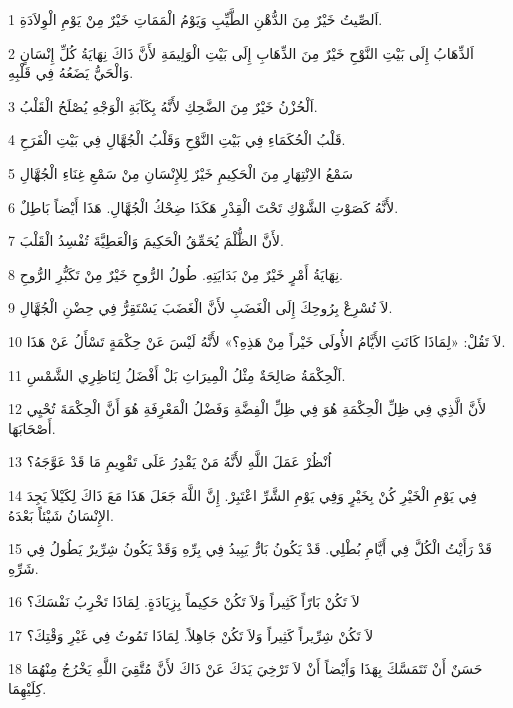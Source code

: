 \par 1 اَلصِّيتُ خَيْرٌ مِنَ الدُّهْنِ الطَّيِّبِ وَيَوْمُ الْمَمَاتِ خَيْرٌ مِنْ يَوْمِ الْوِلاَدَةِ.
\par 2 اَلذِّهَابُ إِلَى بَيْتِ النَّوْحِ خَيْرٌ مِنَ الذِّهَابِ إِلَى بَيْتِ الْوَلِيمَةِ لأَنَّ ذَاكَ نِهَايَةُ كُلِّ إِنْسَانٍ وَالْحَيُّ يَضَعُهُ فِي قَلْبِهِ.
\par 3 اَلْحُزْنُ خَيْرٌ مِنَ الضَّحِكِ لأَنَّهُ بِكَآبَةِ الْوَجْهِ يُصْلَحُ الْقَلْبُ.
\par 4 قَلْبُ الْحُكَمَاءِ فِي بَيْتِ النَّوْحِ وَقَلْبُ الْجُهَّالِ فِي بَيْتِ الْفَرَحِ.
\par 5 سَمْعُ الاِنْتِهَارِ مِنَ الْحَكِيمِ خَيْرٌ لِلإِنْسَانِ مِنْ سَمْعِ غِنَاءِ الْجُهَّالِ
\par 6 لأَنَّهُ كَصَوْتِ الشَّوْكِ تَحْتَ الْقِدْرِ هَكَذَا ضِحْكُ الْجُهَّالِ. هَذَا أَيْضاً بَاطِلٌ.
\par 7 لأَنَّ الظُّلْمَ يُحَمِّقُ الْحَكِيمَ وَالْعَطِيَّةَ تُفْسِدُ الْقَلْبَ.
\par 8 نِهَايَةُ أَمْرٍ خَيْرٌ مِنْ بَدَايَتِهِ. طُولُ الرُّوحِ خَيْرٌ مِنْ تَكَبُّرِ الرُّوحِ.
\par 9 لاَ تُسْرِعْ بِرُوحِكَ إِلَى الْغَضَبِ لأَنَّ الْغَضَبَ يَسْتَقِرُّ فِي حِضْنِ الْجُهَّالِ.
\par 10 لاَ تَقُلْ: «لِمَاذَا كَانَتِ الأَيَّامُ الأُولَى خَيْراً مِنْ هَذِهِ؟» لأَنَّهُ لَيْسَ عَنْ حِكْمَةٍ تَسْأَلُ عَنْ هَذَا.
\par 11 اَلْحِكْمَةُ صَالِحَةٌ مِثْلُ الْمِيرَاثِ بَلْ أَفْضَلُ لِنَاظِرِي الشَّمْسِ.
\par 12 لأَنَّ الَّذِي فِي ظِلِّ الْحِكْمَةِ هُوَ فِي ظِلِّ الْفِضَّةِ وَفَضْلُ الْمَعْرِفَةِ هُوَ أَنَّ الْحِكْمَةَ تُحْيِي أَصْحَابَهَا.
\par 13 اُنْظُرْ عَمَلَ اللَّهِ لأَنَّهُ مَنْ يَقْدِرُ عَلَى تَقْوِيمِ مَا قَدْ عَوَّجَهُ؟
\par 14 فِي يَوْمِ الْخَيْرِ كُنْ بِخَيْرٍ وَفِي يَوْمِ الشَّرِّ اعْتَبِرْ. إِنَّ اللَّهَ جَعَلَ هَذَا مَعَ ذَاكَ لِكَيْلاَ يَجِدَ الإِنْسَانُ شَيْئاً بَعْدَهُ.
\par 15 قَدْ رَأَيْتُ الْكُلَّ فِي أَيَّامِ بُطْلِي. قَدْ يَكُونُ بَارٌّ يَبِيدُ فِي بِرِّهِ وَقَدْ يَكُونُ شِرِّيرٌ يَطُولُ فِي شَرِّهِ.
\par 16 لاَ تَكُنْ بَارّاً كَثِيراً وَلاَ تَكُنْ حَكِيماً بِزِيَادَةٍ. لِمَاذَا تَخْرِبُ نَفْسَكَ؟
\par 17 لاَ تَكُنْ شِرِّيراً كَثِيراً وَلاَ تَكُنْ جَاهِلاً. لِمَاذَا تَمُوتُ فِي غَيْرِ وَقْتِكَ؟
\par 18 حَسَنٌ أَنْ تَتَمَسَّكَ بِهَذَا وَأَيْضاً أَنْ لاَ تَرْخِيَ يَدَكَ عَنْ ذَاكَ لأَنَّ مُتَّقِيَ اللَّهِ يَخْرُجُ مِنْهُمَا كِلَيْهِمَا.
